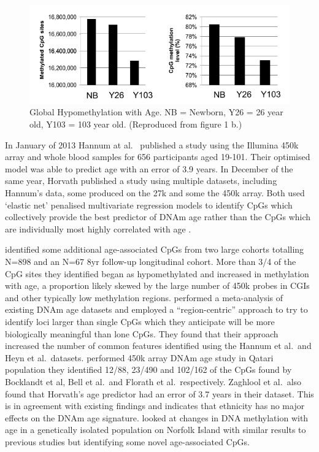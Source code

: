 \documentclass[
]{book}
\begin{document}
\begin{figure}
\includegraphics[width=8.75in]{figs/Heyn2012F1b} \caption{Global Hypomethylation with Age. NB = Newborn, Y26 = 26 year old, Y103 = 103 year old.
(Reproduced from \citet{Heyn2012} figure 1 b.)}\label{fig:Heyn2012F1b}
\end{figure}




In January of 2013 Hannum at al.~\citep{Hannum2013} published a study using the Illumina 450k array and whole blood samples for 656 participants aged 19-101. Their optimised model was able to predict age with an error of 3.9 years. In December of the same year, Horvath \citep{Horvath2013} published a study using multiple datasets, including Hannum's data, some produced on the 27k and some the 450k array. Both used `elastic net' penalised multivariate regression models to identify CpGs which collectively provide the best predictor of DNAm age rather than the CpGs which are individually most highly correlated with age \citep{Friedman2010}.

\citet{Florath2014} identified some additional age-associated CpGs from two large cohorts totalling N=898 and an N=67 8yr follow-up longitudinal cohort. More than 3/4 of the CpG sites they identified began as hypomethylated and increased in methylation with age, a proportion likely skewed by the large number of 450k probes in CGIs and other typically low methylation regions. \citet{Bacalini2015} performed a meta-analysis of existing DNAm age datasets and employed a ``region-centric'' approach to try to identify loci larger than single CpGs which they anticipate will be more biologically meaningful than lone CpGs. They found that their approach increased the number of common features identified using the Hannum et al.~and Heyn et al.~datasets. \citet{Zaghlool2015} performed 450k array DNAm age study in Qatari population they identified 12/88, 23/490 and 102/162 of the CpGs found by Bocklandt et al, Bell et al.~and Florath et al.~respectively. Zaghlool et al.~also found that Horvath's age predictor had an error of 3.7 years in their dataset. This is in agreement with existing findings and indicates that ethnicity has no major effects on the DNAm age signature. \citet{Benton2017} looked at changes in DNA methylation with age in a genetically isolated population on Norfolk Island with similar results to previous studies but identifying some novel age-associated CpGs.
\end{document}
